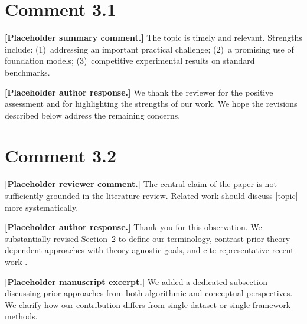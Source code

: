 \section{Comment 3.1}
\begin{reviewercomment}
\textbf{[Placeholder summary comment.]} The topic is timely and relevant. Strengths include: (1)~addressing an important practical challenge; (2)~a promising use of foundation models; (3)~competitive experimental results on standard benchmarks.
\end{reviewercomment}

\begin{refsegment}
\begin{authorresponse}
\textbf{[Placeholder author response.]} We thank the reviewer for the positive assessment and for highlighting the strengths of our work. We hope the revisions described below address the remaining concerns.
\end{authorresponse}
\RRSectionBibliography
\end{refsegment}

\section{Comment 3.2}
\begin{reviewercomment}
\textbf{[Placeholder reviewer comment.]} The central claim of the paper is not sufficiently grounded in the literature review. Related work should discuss [topic] more systematically.
\end{reviewercomment}

\begin{refsegment}
\begin{authorresponse}
\textbf{[Placeholder author response.]} Thank you for this observation. We substantially revised Section~2 to define our terminology, contrast prior theory-dependent approaches with theory-agnostic goals, and cite representative recent work \cite{placeholder-survey,placeholder-method}.
\end{authorresponse}

\begin{authorchange}

\textbf{[Placeholder manuscript excerpt.]} We added a dedicated subsection discussing prior approaches from both algorithmic and conceptual perspectives. We clarify how our contribution differs from single-dataset or single-framework methods.

\ReferToManuscript
\end{authorchange}
\RRSectionBibliography
\end{refsegment}

